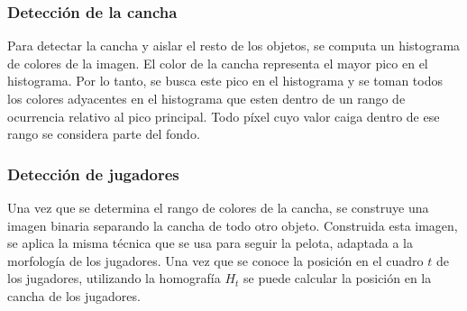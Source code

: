 \documentclass[a4paper,10pt]{article}
\begin{document}
\subsubsection*{Detección de la cancha}

Para detectar la cancha y aislar el resto de los objetos, se computa un histograma de colores de la imagen.
El color de la cancha representa el mayor pico en el histograma.
Por lo tanto, se busca este pico en el histograma y se toman todos los colores adyacentes en el histograma
que esten dentro de un rango de ocurrencia relativo al pico principal.
Todo píxel cuyo valor caiga dentro de ese rango se considera parte del fondo.

\subsubsection*{Detección de jugadores}

Una vez que se determina el rango de colores de la cancha, se construye una imagen binaria separando la cancha de todo otro objeto.
Construida esta imagen, se aplica la misma técnica que se usa para seguir la pelota, adaptada a la morfología de los jugadores.
Una vez que se conoce la posición en el cuadro $t$ de los jugadores, utilizando la homografía $H_t$ se puede calcular la posición
en la cancha de los jugadores.

\printbibliography
\end{document}
